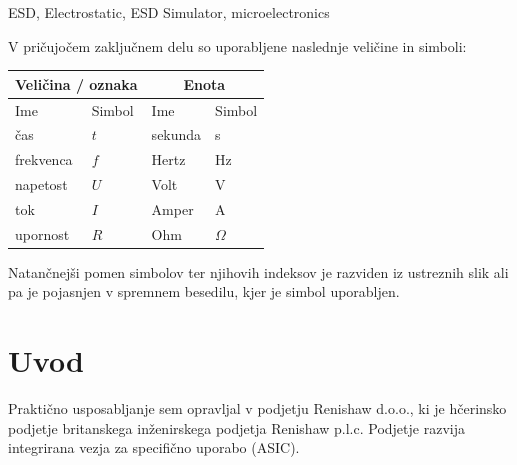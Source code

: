 \documentclass[a4paper,twoside,openright,12pt,Slovene]{book}
\begin{document}
\keywords
ESD, Electrostatic, ESD Simulator, microelectronics


\tableofcontents

\seznamslik
\seznamtabel

\seznamsimbolov
V pričujočem zaključnem delu so uporabljene naslednje veličine in simboli:

\begin{center}
    \begin{tabular}{*{4}{l}} \hline
        \multicolumn{2}{c}{\bf{Veličina / oznaka}}           & \multicolumn{2}{c}{\bf{Enota}} \\ \hline
        Ime                & Simbol                          & Ime      & Simbol              \\ \hline
        čas                & $t$                             & sekunda  & s                   \\
        frekvenca          & $f$                             & Hertz    & Hz                  \\
        napetost           & $U$                             & Volt     & V                  \\
        tok                & $I$                             & Amper    & A                   \\
        upornost           & $R$                             & Ohm      & $\Omega$            \\ \hline

    \end{tabular}
\end{center} 

\noindent
Natančnejši pomen simbolov ter njihovih indeksov je razviden iz ustreznih slik ali pa je pojasnjen v spremnem besedilu, kjer je simbol uporabljen.

\mainmatter

\chapter{Uvod} \label{uvod}

Praktično usposabljanje sem opravljal v podjetju Renishaw d.o.o., ki je hčerinsko podjetje britanskega inženirskega podjetja Renishaw p.l.c.  Podjetje razvija integrirana vezja za specifično uporabo (ASIC). 
\end{document}
